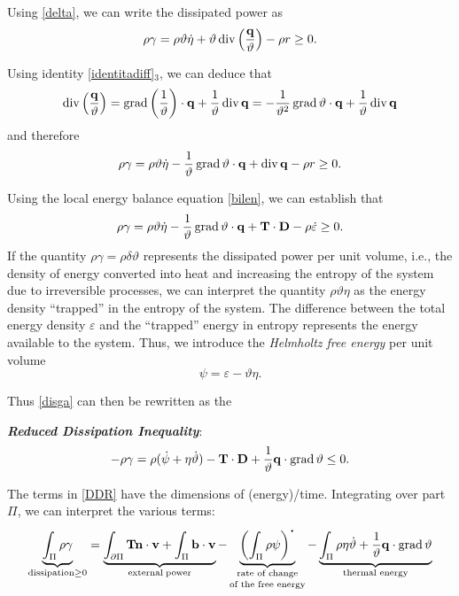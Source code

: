 Using \eqref{delta}, we can write the dissipated power as
\begin{equation}
\rho	\gamma=\rho \vartheta\dot\eta+\vartheta\operatorname{div} \left( \frac{\mathbf{q}}{\vartheta} \right)-\rho r\geq 0.
\end{equation}

Using identity \eqref{identitadiff}$_3$, we can deduce that
\begin{equation}
	\operatorname{div} \left( \frac{\mathbf{q}}{\vartheta} \right)=\operatorname{grad}\left(\frac{1}{\vartheta}\right)\cdot\mathbf{q} +\frac{1}{\vartheta}\operatorname{div} \mathbf{q} =-\frac{1}{\vartheta^2}\operatorname{grad}\vartheta\cdot \mathbf{q} +\frac{1}{\vartheta}\operatorname{div} \mathbf{q} 
\end{equation}
and therefore
\begin{equation}\label{disga}
\rho	\gamma=\rho \vartheta\dot\eta-\frac{1}{\vartheta}\operatorname{grad}\vartheta\cdot \mathbf{q} +\operatorname{div} \mathbf{q} -\rho r\geq 0.
\end{equation}

Using the local energy balance equation \eqref{bilen}, we can establish that
\begin{equation}
	\rho\gamma=\rho\vartheta\dot\eta-\frac{1}{\vartheta}\operatorname{grad}\vartheta\cdot \mathbf{q} +\mathbf{T} \cdot\mathbf{D}-\rho \dot{\varepsilon}\geq 0. 
\end{equation}
If the quantity $\rho\gamma=\rho\delta\vartheta$ represents the dissipated power per unit volume, i.e., the density of energy converted into heat and increasing the entropy of the system due to irreversible processes, we can interpret the quantity $\rho\vartheta\eta$ as the energy density ``trapped'' in the entropy of the system. 
The difference between the total energy density $\varepsilon$ and the ``trapped'' energy in entropy represents the energy available to the system. Thus, we introduce the \textit{Helmholtz free energy} per unit volume
\begin{equation}
	\psi=\varepsilon-\vartheta\eta.
\end{equation}

Thus \eqref{disga} can then be rewritten as the
\begin{definition}
	\textbf{\textit{Reduced Dissipation Inequality}}:
	\begin{equation}\label{DDR}
		-\rho\gamma=\rho(\dot{\psi}+\eta \dot{\vartheta})-\mathbf{T}\cdot\mathbf{D}+\frac{1}{\vartheta}\mathbf{q} \cdot \operatorname{grad} \vartheta\leq 0.
	\end{equation}
\end{definition} 
The terms in \eqref{DDR} have the dimensions of (energy)/time. Integrating over part $\Pi$, we can interpret the various terms:
\begin{equation}
	\underbrace{\int_{\Pi}\rho\gamma}_{{\rm dissipation}\geq 0}=\underbrace{\int_{\partial \Pi}\Tb \nb \cdot \vb +\int_{\Pi}\bb\cdot \vb}_{{\rm external\; power}}-
	\underbrace{\left(\int_{\Pi}\rho\psi\right)^{\mathop{\vcenter{\hbox{\Large$\cdot$}}}}}_{\scriptsize \shortstack{\text{rate of change} \\ \text{of the free energy}}}
	-\underbrace{\int_{\Pi}\rho\eta \dot{\vartheta}+\frac{1}{\vartheta}\qb \cdot \grad\vartheta}_{\text{thermal energy}}
\end{equation}

